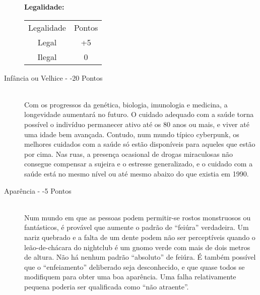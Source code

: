 \documentclass[a4paper]{article}
\begin{document}
\begin{description}
\begin{table}[h]
{\begin{tabular}{ l l }
 \end{tabular} }
\end{table}

\textbf{Legalidade:}
\begin{table}[h]
 \centering
 {\renewcommand\arraystretch{1.25}
 \begin{tabular}{ l l }
  \cline{1-1}\cline{2-2}  
    \multicolumn{1}{|c|}{Legalidade \centering } &
    \multicolumn{1}{c|}{Pontos \centering }
  \\  
  \cline{1-1}\cline{2-2}  
    \multicolumn{1}{|c|}{Legal \centering } &
    \multicolumn{1}{c|}{+5 \centering }
  \\  
  \cline{1-1}\cline{2-2}  
    \multicolumn{1}{|c|}{Ilegal \centering } &
    \multicolumn{1}{c|}{0 \centering }
  \\  
  \hline

 \end{tabular} }
\end{table}

   \item[Infância ou Velhice - -20 Pontos] \hfill \\ Com os progressos da genética, biologia, imunologia e medicina, a
longevidade aumentará no futuro. O cuidado adequado com a saúde
torna possível o indivíduo permanecer ativo até os 80 anos ou mais, e
viver até uma idade bem avançada. Contudo, num mundo típico cyberpunk, os melhores cuidados com a saúde só estão disponíveis para aqueles que estão por cima. Nas ruas, a presença ocasional de drogas miraculosas não consegue compensar a sujeira e o estresse generalizado, e o cuidado com a saúde está no mesmo nível ou até mesmo abaixo do que existia em 1990.

    \item[Aparência - -5 Pontos] \hfill \\ Num mundo em que as pessoas podem permitir-se rostos monstruosos
ou fantásticos, é provável que aumente o padrão de “feiúra” verdadeira.
Um nariz quebrado e a falta de um dente podem não ser perceptíveis
quando o leão-de-chácara do nightclub é um gnomo verde com mais de
dois metros de altura. Não há nenhum padrão “absoluto” de feiúra.
É também possível que o “enfeiamento” deliberado seja
desconhecido, e que quase todos se modifiquem para obter uma boa
aparência. Uma falha relativamente pequena poderia ser qualificada
como “não atraente”.


\end{description}
\end{document}
